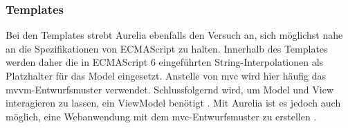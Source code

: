\subsubsection{Templates}
Bei den Templates strebt Aurelia ebenfalls den Versuch an, sich möglichst nahe an die Spezifikationen von ECMAScript zu halten. Innerhalb des Templates werden daher die in ECMAScript 6 eingeführten String-Interpolationen als Platzhalter für das Model eingesetzt. Anstelle von \ac{mvc} wird hier häufig das \ac{mvvm}-Entwurfsmuster verwendet. Schlussfolgernd wird, um Model und View interagieren zu lassen, ein ViewModel benötigt \cite{Inc.2016c}. Mit Aurelia ist es jedoch auch möglich, eine Webanwendung mit dem \ac{mvc}-Entwurfsmuster zu erstellen \cite{Inc.2016b}.